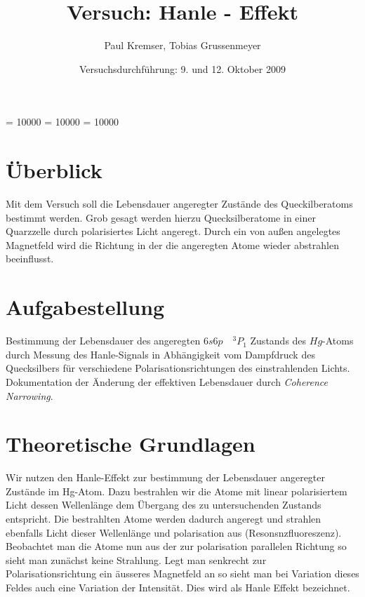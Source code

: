 \documentclass[12pt]{article}
\newcommand{\changefont}[3]{
\fontfamily{#1} \fontseries{#2} \fontshape{#3} \selectfont}
\begin{document}
\clubpenalty = 10000
\widowpenalty = 10000 
\displaywidowpenalty = 10000

\onehalfspacing
\changefont{ptm}{m}{n} 

\begin{titlepage}
\author{Paul Kremser, Tobias Grussenmeyer}
\title{Versuch: Hanle - Effekt}
\date{Versuchsdurchführung: 9. und 12. Oktober 2009} 
\maketitle
\thispagestyle{empty}
\end{titlepage}


\tableofcontents
\thispagestyle{empty}
\newpage
{}
\section{Überblick}
Mit dem Versuch soll die Lebensdauer angeregter Zustände des Queckilberatoms bestimmt werden. Grob gesagt werden hierzu Quecksilberatome in einer 
Quarzzelle durch polarisiertes Licht angeregt. Durch ein von außen angelegtes Magnetfeld wird die Richtung
in der die angeregten Atome wieder abstrahlen beeinflusst.

\section{Aufgabestellung}
Bestimmung der Lebensdauer des angeregten $6s6p \quad ^3P_1$ Zustands des $Hg$-Atoms durch Messung des Hanle-Signals in Abhängigkeit vom Dampfdruck
des Quecksilbers für verschiedene Polarisationsrichtungen des einstrahlenden Lichts. Dokumentation der Änderung der effektiven Lebensdauer durch
\textit{Coherence Narrowing}.

\section{Theoretische Grundlagen}

Wir nutzen den Hanle-Effekt zur bestimmung der Lebensdauer angeregter  Zustände im Hg-Atom. Dazu bestrahlen wir die Atome mit linear
polarisiertem Licht dessen Wellenlänge dem Übergang des zu untersuchenden Zustands entspricht. Die bestrahlten Atome werden 
dadurch angeregt und strahlen ebenfalls Licht dieser Wellenlänge und polarisation aus (Resonsnzfluoreszenz). Beobachtet man die Atome
nun aus der zur polarisation parallelen Richtung so sieht man zunächst keine Strahlung. Legt man senkrecht zur Polarisationsrichtung 
ein äusseres Magnetfeld an so sieht man bei Variation dieses Feldes auch eine Variation der Intensität. Dies wird als Hanle Effekt bezeichnet.
\end{document}
